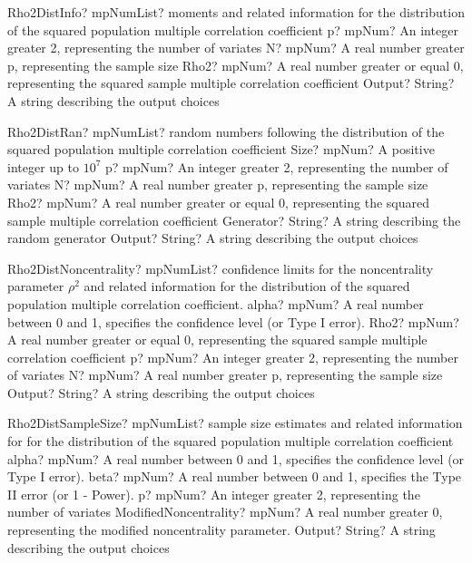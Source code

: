 \documentclass[12pt,a4paper,openany]{book}
\begin{document}
\begin{mpFunctionsExtract}
\mpFunctionFourNotImplemented
{Rho2DistInfo? mpNumList? moments and related information for the distribution of the squared population multiple correlation coefficient}
{p? mpNum? An integer greater 2, representing the number of variates}
{N? mpNum? A real number greater p, representing the sample size}
{Rho2? mpNum? A real number greater or equal 0, representing the squared sample multiple correlation coefficient}
{Output? String? A string describing the output choices}
\end{mpFunctionsExtract}

\begin{mpFunctionsExtract}
\mpFunctionSixNotImplemented
{Rho2DistRan? mpNumList? random numbers following the distribution of the squared population multiple correlation coefficient}
{Size? mpNum? A positive integer up to $10^7$}
{p? mpNum? An integer greater 2, representing the number of variates}
{N? mpNum? A real number greater p, representing the sample size}
{Rho2? mpNum? A real number greater or equal 0, representing the squared sample multiple correlation coefficient}
{Generator? String? A string describing the random generator}
{Output? String? A string describing the output choices}
\end{mpFunctionsExtract}

\begin{mpFunctionsExtract}
\mpFunctionFiveNotImplemented
{Rho2DistNoncentrality? mpNumList? confidence limits for the noncentrality parameter $\rho^2$ and related information for the distribution of the squared population multiple correlation coefficient.}
{alpha? mpNum? A real number between 0 and 1, specifies the confidence level (or Type I error).}
{Rho2? mpNum? A real number greater or equal 0, representing the squared sample multiple correlation coefficient}
{p? mpNum? An integer greater 2, representing the number of variates}
{N? mpNum? A real number greater p, representing the sample size}
{Output? String? A string describing the output choices}
\end{mpFunctionsExtract}

\begin{mpFunctionsExtract}
\mpFunctionFiveNotImplemented
{Rho2DistSampleSize? mpNumList? sample size estimates and related information for for the distribution of the squared population multiple correlation coefficient}
{alpha? mpNum? A real number between 0 and 1, specifies the confidence level (or Type I error).}
{beta? mpNum?  A real number between 0 and 1, specifies the Type II error (or 1 - Power).}
{p? mpNum? An integer greater 2, representing the number of variates}
{ModifiedNoncentrality? mpNum? A real number greater 0, representing the modified noncentrality parameter.}
{Output? String? A string describing the output choices}
\end{mpFunctionsExtract}
\end{document}
